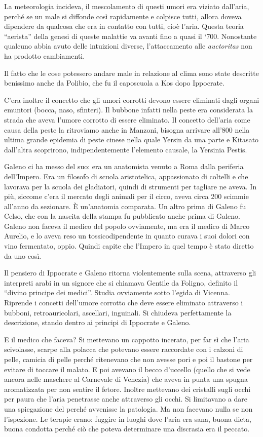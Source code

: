 \documentclass[]{article}
\begin{document}
La meteorologia incideva, il mescolamento di questi umori era viziato
dall'aria, perché se un male si diffonde così rapidamente e colpisce
tutti, allora doveva dipendere da qualcosa che era in contatto con
tutti, cioè l'aria. Questa teoria ``aerista'' della genesi di queste
malattie va avanti fino a quasi il `700. Nonostante qualcuno abbia avuto
delle intuizioni diverse, l'attaccamento alle \emph{auctoritas} non ha
prodotto cambiamenti.

Il fatto che le cose potessero andare male in relazione al clima sono
state descritte benissimo anche da Polibio, che fu il caposcuola a Kos
dopo Ippocrate.

C'era inoltre il concetto che gli umori corrotti devono essere eliminati
dagli organi emuntori (bocca, naso, sfinteri). Il bubbone infatti nella
peste era considerata la strada che aveva l'umore corrotto di essere
eliminato. Il concetto dell'aria come causa della peste la ritroviamo
anche in Manzoni, bisogna arrivare all'800 nella ultima grande epidemia
di peste cinese nella quale Yersin da una parte e Kitasato dall'altra
scoprirono, indipendentemente l'elemento causale, la Yersinia Pestis.

Galeno ci ha messo del suo: era un anatomista venuto a Roma dalla
periferia dell'Impero. Era un filosofo di scuola aristotelica,
appassionato di coltelli e che lavorava per la scuola dei gladiatori,
quindi di strumenti per tagliare ne aveva. In più, siccome c'era il
mercato degli animali per il circo, aveva circa 200 scimmie all'anno da
sezionare. È un'anatomia comparata. Un altro prima di Galeno fu Celso,
che con la nascita della stampa fu pubblicato anche prima di Galeno.
Galeno non faceva il medico del popolo ovviamente, ma era il medico di
Marco Aurelio, e lo aveva reso un tossicodipendente in quanto curava i
suoi dolori con vino fermentato, oppio. Quindi capite che l'Impero in
quel tempo è stato diretto da uno così.

Il pensiero di Ippocrate e Galeno ritorna violentemente sulla scena,
attraverso gli interpreti arabi in un signore che si chiamava Gentile da
Foligno, definito il ``divino principe dei medici''. Studia ovviamente
sotto l'egida di Vicenna. Riprende i concetti dell'umore corrotto che
deve essere eliminato attraverso i bubboni, retroauricolari, ascellari,
inguinali. Si chiudeva perfettamente la descrizione, stando dentro ai
principi di Ippocrate e Galeno.

E il medico che faceva? Si mettevano un cappotto incerato, per far sì
che l'aria scivolasse, scarpe alla polacca che potevano essere
raccordate con i calzoni di pelle, camicia di pelle perché ritenevano
che non avesse pori e poi il bastone per evitare di toccare il malato. E
poi avevano il becco d'uccello (quello che si vede ancora nelle maschere
al Carnevale di Venezia) che aveva in punta una spugna aromatizzata per
non sentire il fetore. Inoltre mettevano dei cristalli sugli occhi per
paura che l'aria penetrasse anche attraverso gli occhi. Si limitavano a
dare una spiegazione del perché avvenisse la patologia. Ma non facevano
nulla se non l'ispezione. Le terapie erano: fuggire in luoghi dove
l'aria era sana, buona dieta, buona condotta perché ciò che poteva
determinare una discrasia era il peccato.
\end{document}
